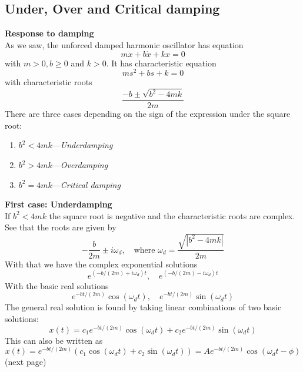 \documentclass{report}
\begin{document}
\subsection{Under, Over and Critical damping}
\textbf{Response to damping}\\
As we saw, the unforced damped harmonic oscillator has equation
\begin{equation*}
m\ddot{x}+b\dot{x}+kx=0
\end{equation*}
with $m>0,b\geq0$ and $k>0$. It has characteristic equation
\begin{equation*}
ms^2+bs+k=0
\end{equation*}
with characteristic roots
\begin{equation*}
\frac{-b\pm\sqrt{b^2-4mk}}{2m}
\end{equation*}
There are three cases depending on the sign of the expression under the square root:
\begin{enumerate}
\item $b^2<4mk$---\textit{Underdamping}
\item $b^2>4mk$---\textit{Overdamping}
\item $b^2=4mk$---\textit{Critical damping}
\end{enumerate}
\textbf{First case: Underdamping}\\
If $b^2<4mk$ the square root is negative and the characteristic roots are complex. See that the roots are given by
\begin{equation*}
-\frac{b}{2m}\pm i\omega_d,\quad\text{where }\omega_d=\frac{\sqrt{|b^2-4mk|}}{2m}
\end{equation*}
With that we have the complex exponential solutions
\begin{equation*}
e^{(-b/(2m)+i\omega_d)t},\quad e^{(-b/(2m)-i\omega_d)t}
\end{equation*}
With the basic real solutions
\begin{equation*}
e^{-bt/(2m)}\cos(\omega_dt),\quad e^{-bt/(2m)}\sin(\omega_dt)
\end{equation*}
The general real solution is found by taking linear combinations of two basic solutions:
\begin{equation*}
x(t)=c_1e^{-bt/(2m)}\cos(\omega_dt)+c_2e^{-bt/(2m)}\sin(\omega_dt)
\end{equation*}
This can also be written as
\begin{equation*}
x(t)=e^{-bt/(2m)}(c_1\cos(\omega_dt)+c_2\sin(\omega_dt))
=Ae^{-bt/(2m)}\cos(\omega_dt-\phi)
\end{equation*}
(next page)
\end{document}
